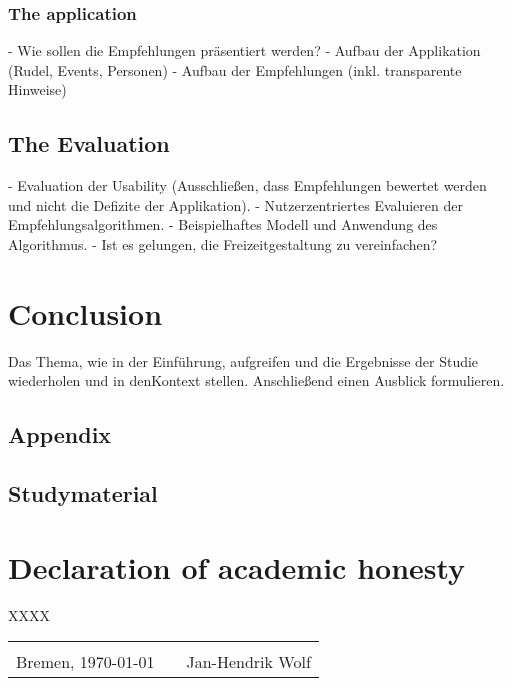 \documentclass[12pt,numbers=noenddot,parskip,bibliography=totocnumbered,listof=totocnumbered]{scrreprt}
\begin{document}
\subsection{The application}
- Wie sollen die Empfehlungen präsentiert werden?
	- Aufbau der Applikation (Rudel, Events, Personen)
	- Aufbau der Empfehlungen (inkl. transparente Hinweise)
\section{The Evaluation}
- Evaluation der Usability (Ausschließen, dass Empfehlungen bewertet werden und nicht die Defizite der Applikation).
- Nutzerzentriertes Evaluieren der Empfehlungsalgorithmen.
- Beispielhaftes Modell und Anwendung des Algorithmus.
- Ist es gelungen, die Freizeitgestaltung zu vereinfachen?

\chapter{Conclusion}
Das Thema, wie in der Einführung, aufgreifen und die Ergebnisse der Studie wiederholen und in denKontext stellen. Anschließend einen Ausblick formulieren.

\begin{appendix} 
\chapter{Appendix}
\newpage
\section{Studymaterial}
\vspace*{\fill}
\label{lab:Studymaterial}
\vspace*{\fill}
\end{appendix}

\clearpage
{}



\listoffigures

\chapter*{Declaration of academic honesty}
\thispagestyle{empty}
XXXX
\begin{center}
\begin{tabular}{lp{2em}l} 
 \hspace{5cm}   && \hspace{4cm} \\\cline{1-1}\cline{3-3} 
 Bremen, \today    && Jan-Hendrik Wolf 
\end{tabular} 
\end{center}
\end{document}
